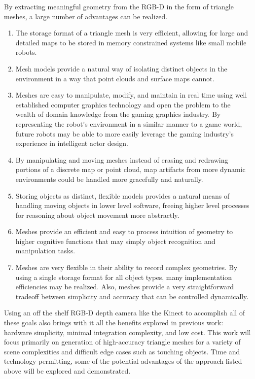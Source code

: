 \documentclass[english]{article}
\begin{document}
By extracting meaningful geometry from the RGB-D in the form of triangle meshes, a large number of advantages can be realized.
\begin{enumerate}
\item The storage format of a triangle mesh is very efficient, allowing for large and detailed maps to be stored in memory constrained systems like small mobile robots. 
\item Mesh models provide a natural way of isolating distinct objects in the environment in a way that point clouds and surface maps cannot. 
\item Meshes are easy to manipulate, modify, and maintain in real time using well established computer graphics technology and open the problem to the wealth of domain knowledge from the gaming graphics industry. By representing the robot's environment in a similar manner to a game world, future robots may be able to more easily leverage the gaming industry's experience in intelligent actor design. 
\item By manipulating and moving meshes instead of erasing and redrawing portions of a discrete map or point cloud, map artifacts from more dynamic environments could be handled more gracefully and naturally.
\item Storing objects as distinct, flexible models provides a natural means of handling moving objects in lower level software, freeing higher level processes for reasoning about object movement more abstractly.
\item Meshes provide an efficient and easy to process intuition of geometry to higher cognitive functions that may simply object recognition and manipulation tasks.
\item Meshes are very flexible in their ability to record complex geometries. By using a single storage format for all object types, many implementation efficiencies may be realized. Also, meshes provide a very straightforward tradeoff between simplicity and accuracy that can be controlled dynamically.
\end{enumerate}
Using an off the shelf RGB-D depth camera like the Kinect to accomplish all of these goals also brings with it all the benefits explored in previous work: hardware simplicity, minimal integration complexity, and low cost. This work will focus primarily on generation of high-accuracy triangle meshes for a variety of scene complexities and difficult edge cases such as touching objects. Time and technology permitting, some of the potential advantages of the approach listed above will be explored and demonstrated.
\end{document}

